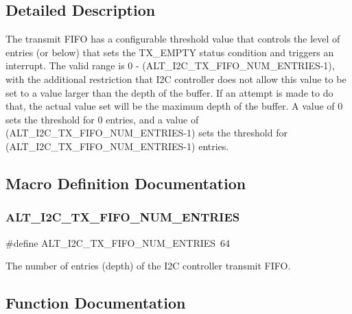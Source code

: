 \subsection{Detailed Description}
The transmit F\+I\+FO has a configurable threshold value that controls the level of entries (or below) that sets the T\+X\+\_\+\+E\+M\+P\+TY status condition and triggers an interrupt. The valid range is 0 -\/ (A\+L\+T\+\_\+\+I2\+C\+\_\+\+T\+X\+\_\+\+F\+I\+F\+O\+\_\+\+N\+U\+M\+\_\+\+E\+N\+T\+R\+I\+E\+S-\/1), with the additional restriction that I2C controller does not allow this value to be set to a value larger than the depth of the buffer. If an attempt is made to do that, the actual value set will be the maximum depth of the buffer. A value of 0 sets the threshold for 0 entries, and a value of (A\+L\+T\+\_\+\+I2\+C\+\_\+\+T\+X\+\_\+\+F\+I\+F\+O\+\_\+\+N\+U\+M\+\_\+\+E\+N\+T\+R\+I\+E\+S-\/1) sets the threshold for (A\+L\+T\+\_\+\+I2\+C\+\_\+\+T\+X\+\_\+\+F\+I\+F\+O\+\_\+\+N\+U\+M\+\_\+\+E\+N\+T\+R\+I\+E\+S-\/1) entries. 

\subsection{Macro Definition Documentation}
\mbox{\label{group__ALT__I2C__TX__FIFO_ga8fdcef1d93529a30efd59075f699ad95}} 
\subsubsection{\texorpdfstring{ALT\_I2C\_TX\_FIFO\_NUM\_ENTRIES}{ALT\_I2C\_TX\_FIFO\_NUM\_ENTRIES}}
{\footnotesize\ttfamily \#define A\+L\+T\+\_\+\+I2\+C\+\_\+\+T\+X\+\_\+\+F\+I\+F\+O\+\_\+\+N\+U\+M\+\_\+\+E\+N\+T\+R\+I\+ES~64}

The number of entries (depth) of the I2C controller transmit F\+I\+FO. 

\subsection{Function Documentation}
\mbox{\label{group__ALT__I2C__TX__FIFO_gad05ec1e8cc6ad14170154fb6ceac7bc6}} 
